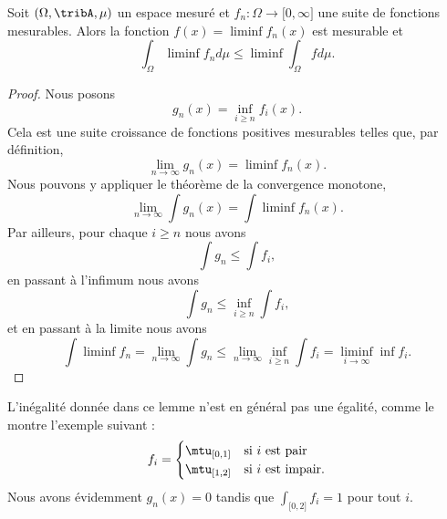 \begin{lemma}   \label{LemFatouUOQqyk}
    Soit \( (\Omega,\tribA,\mu)\) un espace mesuré et \( f_n\colon \Omega\to \mathopen[ 0 , \infty \mathclose]  \) une suite de fonctions mesurables. Alors la fonction \( f(x)=\liminf f_n(x)\) est mesurable et
    \begin{equation}
        \int_{\Omega}\liminf f_nd\mu\leq\liminf\int_{\Omega}fd\mu.
    \end{equation}
\end{lemma}

\begin{proof}
    Nous posons 
    \begin{equation}
        g_n(x)=\inf_{i\geq n}f_i(x).
    \end{equation}
    Cela est une suite croissance de fonctions positives mesurables telles que, par définition, 
    \begin{equation}
        \lim_{n\to \infty}g_n(x)=\liminf f_n(x).
    \end{equation}
    Nous pouvons y appliquer le théorème de la convergence monotone,
    \begin{equation}
        \lim_{n\to \infty} \int g_n(x)=\int\liminf f_n(x).
    \end{equation}
    Par ailleurs, pour chaque \( i\geq n\) nous avons
    \begin{equation}
        \int g_n\leq \int f_i,
    \end{equation}
    en passant à l'infimum nous avons
    \begin{equation}
        \int g_n\leq \inf_{i\geq n}\int f_i,
    \end{equation}
    et en passant à la limite nous avons
    \begin{equation}
        \int\liminf f_n=\lim_{n\to \infty} \int g_n\leq \lim_{n\to \infty} \inf_{i\geq n}\int f_i=\liminf_{i\to\infty}\inf f_i.
    \end{equation}
\end{proof}

L'inégalité donnée dans ce lemme n'est en général pas une égalité, comme le montre l'exemple suivant :
\begin{equation}
    f_i=\begin{cases}
        \mtu_{\mathopen[ 0 , 1 \mathclose]}    &   \text{si \( i\) est pair}\\
        \mtu_{\mathopen[ 1 , 2 \mathclose]}    &    \text{si \( i\) est impair}.
    \end{cases}
\end{equation}
Nous avons évidemment \( g_n(x)=0\) tandis que \( \int_{\mathopen[ 0 , 2 \mathclose]}f_i=1\) pour tout \( i\).

